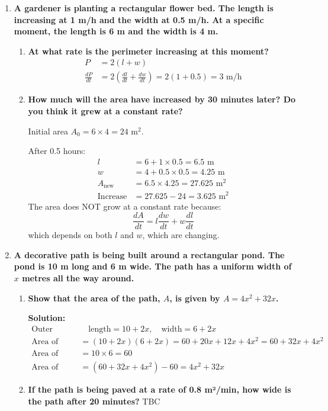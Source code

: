 \documentclass[12pt]{article}
\begin{document}
\begin{enumerate}[resume]
    \item \textbf{A gardener is planting a rectangular flower bed. The length is increasing at 1 m/h and the width at 0.5 m/h. At a specific moment, the length is 6 m and the width is 4 m.}
    \begin{enumerate}
        \item \textbf{At what rate is the perimeter increasing at this moment?}
        \begin{align*}
            P &= 2(l + w) \\
            \frac{dP}{dt} &= 2\left(\frac{dl}{dt} + \frac{dw}{dt}\right) = 2(1 + 0.5) = 3 \text{ m/h}
        \end{align*}
        
        \item \textbf{How much will the area have increased by 30 minutes later? Do you think it grew at a constant rate?}
        
        Initial area \(A_0 = 6 \times 4 = 24 \text{ m}^2\).
        
        After 0.5 hours:
        \begin{align*}
            l &= 6 + 1 \times 0.5 = 6.5 \text{ m} \\
            w &= 4 + 0.5 \times 0.5 = 4.25 \text{ m} \\
            A_{\text{new}} &= 6.5 \times 4.25 = 27.625 \text{ m}^2 \\
            \text{Increase} &= 27.625 - 24 = 3.625 \text{ m}^2
        \end{align*}
        The area does NOT grow at a constant rate because:
        \[
        \frac{dA}{dt} = l \frac{dw}{dt} + w \frac{dl}{dt}
        \]
        which depends on both \(l\) and \(w\), which are changing.
    \end{enumerate}
    
    \item \textbf{A decorative path is being built around a rectangular pond. The pond is 10 m long and 6 m wide. The path has a uniform width of \(x\) metres all the way around.}
    \begin{enumerate}
        \item \textbf{Show that the area of the path, \(A\), is given by \(A = 4x^2 + 32x\).}
        
        \textbf{Solution:}
        \begin{align*}
            \text{Outer rectangle dimensions:} & \quad \text{length} = 10 + 2x, \quad \text{width} = 6 + 2x \\
            \text{Area of outer rectangle} &= (10 + 2x)(6 + 2x) = 60 + 20x + 12x + 4x^2 = 60 + 32x + 4x^2 \\
            \text{Area of pond} &= 10 \times 6 = 60 \\
            \text{Area of path} &= (60 + 32x + 4x^2) - 60 = 4x^2 + 32x
        \end{align*}
        
        \item \textbf{If the path is being paved at a rate of 0.8 m²/min, how wide is the path after 20 minutes?}
        TBC

    \end{enumerate}
\end{enumerate}
\end{document}
